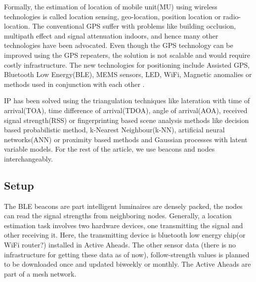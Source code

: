 \vspace{3mm}
Formally, the estimation of location of mobile unit(MU) using wireless technologies is called location sensing, geo-location, position location or radio-location\cite{liu}. The conventional GPS suffer with problems like building occlusion, multipath effect \cite{fang} and signal attenuation \cite{geospatial}  indoors, and hence many other technologies have been advocated.  Even though the GPS technology can be improved using the GPS repeaters, the solution is not scalable and would require costly infrastructure. The new technologies for positioning include Assisted GPS,  Bluetooth Low Energy(BLE), MEMS sensors, LED, WiFi, Magnetic anomalies  or methods used in conjunction with each other \cite{geospatial}. 

IP has been solved using the triangulation techniques like lateration with  time of arrival(TOA), time difference of arrival(TDOA), angle of arrival(AOA), received signal strength(RSS) or fingerprinting based scene analysis methods like decision based probabilistic method, k-Nearest Neighbour(k-NN), artificial neural networks(ANN) or proximity based methods\cite{liu} and Gaussian processes with latent variable models\cite{ferris}. For the rest of the article, we use beacons and nodes interchangeably. 
 \\


\subsection{Setup}
The BLE beacons are part intelligent luminaires are densely packed, the nodes can read the signal strengths from neighboring nodes. Generally, a location estimation task involves two hardware devices, one transmitting the signal and other receiving it\cite{liu}. Here, the transmitting device is bluetooth low energy chip(or WiFi router?) installed in Active Aheads. The other sensor data (there is no infrastructure for getting these data as of now),  follow-strength values is planned to be downloaded once and updated biweekly or monthly. The Active Aheads are part of a mesh network.
